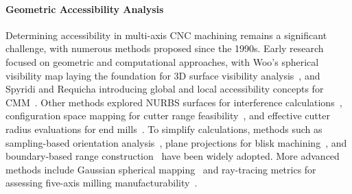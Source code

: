 \paragraph{Geometric Accessibility Analysis}


Determining accessibility in multi-axis CNC machining remains a significant challenge, with numerous methods proposed since the 1990s. Early research focused on geometric and computational approaches, with Woo’s spherical visibility map laying the foundation for 3D surface visibility analysis~\cite{woo1994visibility,elber1994accessibility}, and Spyridi and Requicha introducing global and local accessibility concepts for CMM~\cite{spyridi1990accessibility}. Other methods explored NURBS surfaces for interference calculations~\cite{lee19952}, configuration space mapping for cutter range feasibility~\cite{choi1997c}, and effective cutter radius evaluations for end mills~\cite{vafaeesefa1998accessibility}.
To simplify calculations, methods such as sampling-based orientation analysis~\cite{dhaliwal2003algorithms,zhao2018dscarver,mahdavi2020vdac}, plane projections for blisk machining~\cite{chen2015collision}, and boundary-based range construction~\cite{liang2016accessible} have been widely adopted. More advanced methods include Gaussian spherical mapping~\cite{liu2020sequence} and ray-tracing metrics for assessing five-axis milling manufacturability~\cite{chen2021design}.




